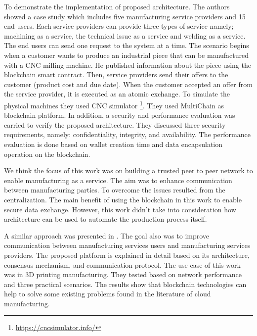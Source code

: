 \documentclass[runningheads]{llncs}
\begin{document}
\noindent
To demonstrate the implementation of proposed architecture. The authors showed a case study which includes five manufacturing service providers and 15 end users. Each service providers can provide three types of service namely; machining as a service, the technical issue as a service and welding as a service. The end users can send one request to the system at a time. The scenario begins when a customer wants to produce an industrial piece that can be manufactured with a CNC milling machine. He published information about the piece using the blockchain smart contract. Then, service providers send their offers to the customer (product cost and due date). When the customer accepted an offer from the service provider, it is executed as an atomic exchange. To simulate the physical machines they used CNC simulator \footnote{\url{https://cncsimulator.info/}}. They used MultiChain as blockchain platform. In addition, a security and performance evaluation was carried to verify the proposed architecture. They discussed three security requirements, namely: confidentiality, integrity, and availability. The performance evaluation is done based on wallet creation time and data encapsulation operation on the blockchain. \bigbreak

\noindent
We think the focus of this work was on building a trusted peer to peer network to enable manufacturing as a service. The aim was to enhance communication between manufacturing parties. To overcome the issues resulted from the centralization. The main benefit of using the blockchain in this work to enable secure data exchange. However, this work didn't take into consideration how architecture can be used to automate the production process itself. \bigbreak

\noindent
A similar approach was presented in \cite{Barenji2019}. The goal also was to improve communication between manufacturing services users and manufacturing services providers. The proposed platform is explained in detail based on its architecture, consensus mechanism, and communication protocol. The use case of this work was in 3D printing manufacturing. They tested based on network performance and three practical scenarios. The results show that blockchain technologies can help to solve some existing problems found in the literature of cloud manufacturing. 
\end{document}
